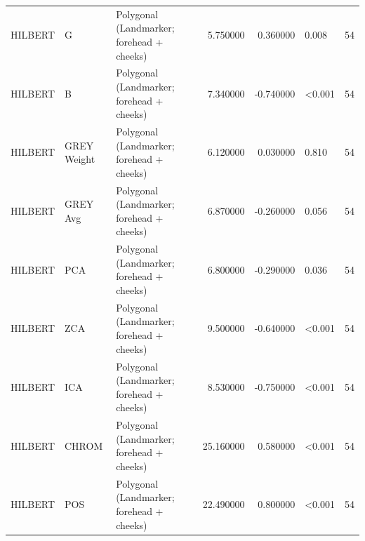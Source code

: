 \begin{table}[htbp]
\begin{tabular}{l l l r r l r}
HILBERT & G & Polygonal (Landmarker; forehead + cheeks) & 5.750000 & 0.360000 & 0.008 & 54 \\
HILBERT & B & Polygonal (Landmarker; forehead + cheeks) & 7.340000 & -0.740000 & <0.001 & 54 \\
HILBERT & GREY Weight & Polygonal (Landmarker; forehead + cheeks) & 6.120000 & 0.030000 & 0.810 & 54 \\
HILBERT & GREY Avg & Polygonal (Landmarker; forehead + cheeks) & 6.870000 & -0.260000 & 0.056 & 54 \\
HILBERT & PCA & Polygonal (Landmarker; forehead + cheeks) & 6.800000 & -0.290000 & 0.036 & 54 \\
HILBERT & ZCA & Polygonal (Landmarker; forehead + cheeks) & 9.500000 & -0.640000 & <0.001 & 54 \\
HILBERT & ICA & Polygonal (Landmarker; forehead + cheeks) & 8.530000 & -0.750000 & <0.001 & 54 \\
HILBERT & CHROM & Polygonal (Landmarker; forehead + cheeks) & 25.160000 & 0.580000 & <0.001 & 54 \\
HILBERT & POS & Polygonal (Landmarker; forehead + cheeks) & 22.490000 & 0.800000 & <0.001 & 54 \\
\bottomrule
\end{tabular}

\end{table}
